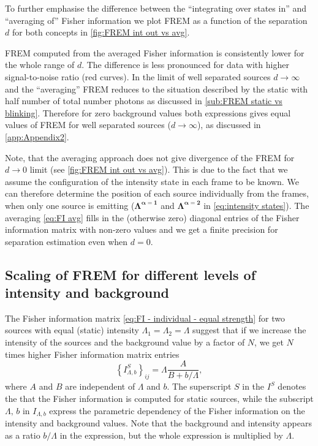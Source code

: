 To further emphasise the difference between the ``integrating over states in'' and ``averaging of'' Fisher information we plot FREM as a function of the separation $d$ for both concepts in \autoref{fig:FREM int out vs avg}.

FREM computed from the averaged Fisher information is consistently lower for the whole range of $d$. The difference is less pronounced for data with higher signal-to-noise ratio (red curves). In the limit of well separated sources $d\rightarrow\infty$ and the ``averaging'' FREM reduces to the situation described by the static with half number of total number photons as discussed in \autoref{sub:FREM static vs blinking}. Therefore for zero background values both expressions gives equal values of FREM for well separated sources ($d\rightarrow\infty$), as discussed in \autoref{app:Appendix2}.

Note, that the averaging approach does not give divergence of the FREM for $d\rightarrow 0$ limit (see \autoref{fig:FREM int out vs avg}\aaa). This is due to the fact that we assume the configuration of the intensity state in each frame to be known. We can therefore determine the position of each source individually from the frames, when only one source is emitting ($\bm{\Lambda^{\alpha=1}}$ and $\bm{\Lambda^{\alpha=2}}$ in \autoref{eq:intensity states}). The averaging \autoref{eq:FI avg} fills in the (otherwise zero) diagonal entries of the Fisher information matrix with non-zero values and we get a finite precision for separation estimation even when $d=0$.


\subsection{Scaling of FREM for different levels of intensity and background\label{sub:scaling}}

The Fisher information matrix \autoref{eq:FI - individual - equal strength} for two sources with equal (static) intensity $\Lambda_1=\Lambda_2=\Lambda$ suggest that if we increase the intensity of the sources and the background value by a factor of $N$, we get $N$ times higher Fisher information matrix entries
%
\begin{equation}
	\left\{I_{\Lambda,b}^{S}\right\}_{ij}=\Lambda\frac{A}{B+b/\Lambda},
	\label{eq:FI static on lambda b}
\end{equation}
%
where $A$ and $B$ are independent of $\Lambda$ and $b$. The superscript $S$ in the $I^S$ denotes the that the Fisher information is computed for static sources, while the subscript $\Lambda,\,b$ in $I_{\Lambda,b}$ express the parametric dependency of the Fisher information on the intensity and background values.  Note that the background and intensity appears as a ratio $b/\Lambda$ in the expression, but the whole expression is multiplied by $\Lambda$. 


